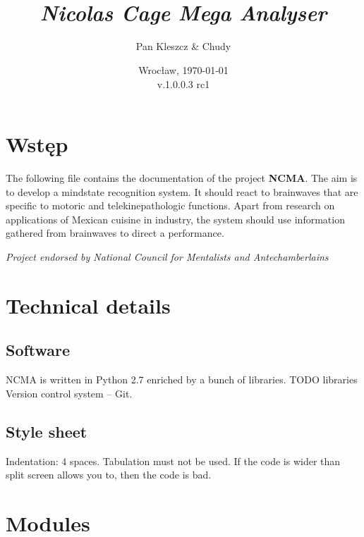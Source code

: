 \documentclass[11pt,leqno]{article}
\title{\vspace{-3cm} {\bf \projectName \\ {\it \small Nicolas Cage Mega Analyser}}}
\author{Pan Kleszcz \& Chudy}
\date{Wrocław, \today\\
{\small v.1.0.0.3 rc1}}
\newcommand{\projectName}{NCMA}%
\begin{document}
\maketitle

\section{Wstęp}	%
The following file contains the documentation of the project {\bf \projectName}.
The aim is to develop a mindstate recognition system.
It should react to brainwaves that are specific to motoric and telekinepathologic functions.
Apart from research on applications of Mexican cuisine in industry, the system should use information gathered from brainwaves to direct a performance.

\vspace{1cm}

{\it Project endorsed by National Council for Mentalists and Antechamberlains}
\newpage
\section{Technical details}
\subsection{Software}
NCMA is written in Python 2.7 enriched by a bunch of libraries.
TODO libraries
Version control system -- Git.

\subsection{Style sheet}
Indentation: 4 spaces.
Tabulation must not be used.
If the code is wider than split screen allows you to, then the code is bad.
\newpage
\section{Modules}
\end{document}
